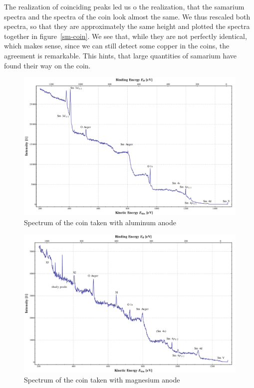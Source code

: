 \documentclass[a4paper,10pt]{scrartcl}
\begin{document}
The realization of coinciding peaks led us o the realization, that the samarium spectra and the spectra of the coin look almost the same. We thus rescaled both spectra, so that they are approximately the same height and plotted the spectra together in figure~\ref{sm-coin}. We see that, while they are not perfectly identical, which makes sense, since we can still detect some copper in the coins, the agreement is remarkable. This hints, that large quantities of samarium have found their way on the coin.


\begin{figure}[h]
\centering
\includegraphics[scale=0.3]{img/samarium_binding_al}
\caption{Spectrum of the coin taken with aluminum anode \label{fig:coin_al}}
\end{figure}

\begin{figure}[h]
\centering
\includegraphics[scale=0.3]{img/samarium_binding_mg}
\caption{Spectrum of the coin taken with magnesium anode \label{fig:coin_mg}}
\end{figure}
\end{document}
